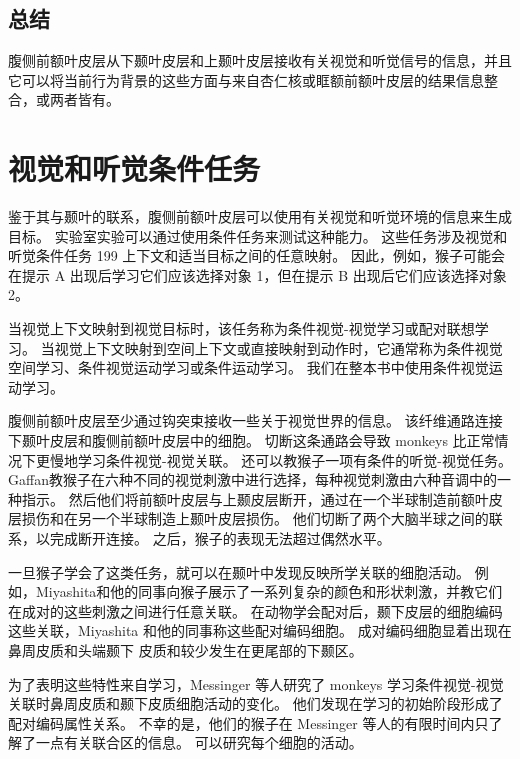 \subsection{总结}
腹侧前额叶皮层从下颞叶皮层和上颞叶皮层接收有关视觉和听觉信号的信息，并且它可以将当前行为背景的这些方面与来自杏仁核或眶额前额叶皮层的结果信息整合\cite{barbas1989architecture}，或两者皆有。


\section{视觉和听觉条件任务}
\par
鉴于其与颞叶的联系，腹侧前额叶皮层可以使用有关视觉和听觉环境的信息来生成目标。 
实验室实验可以通过使用条件任务来测试这种能力。 
这些任务涉及视觉和听觉条件任务 199 上下文和适当目标之间的任意映射。
因此，例如，猴子可能会在提示 A 出现后学习它们应该选择对象 1，但在提示 B 出现后它们应该选择对象 2。
\par


当视觉上下文映射到视觉目标时，该任务称为条件视觉-视觉学习或配对联想学习。 
当视觉上下文映射到空间上下文或直接映射到动作时，它通常称为条件视觉空间学习、条件视觉运动学习或条件运动学习。
我们在整本书中使用条件视觉运动学习。
\par


腹侧前额叶皮层至少通过钩突束接收一些关于视觉世界的信息。 
该纤维通路连接下颞叶皮层和腹侧前额叶皮层中的细胞\cite{ungerleider1989projections}。 
切断这条通路会导致 monkeys 比正常情况下更慢地学习条件视觉-视觉关联\cite{eacott1992inferotemporal,gutnikov1997temporo}。
还可以教猴子一项有条件的听觉-视觉任务。 
Gaffan\cite{gaffan1991auditory}教猴子在六种不同的视觉刺激中进行选择，每种视觉刺激由六种音调中的一种指示。 
然后他们将前额叶皮层与上颞皮层断开，通过在一个半球制造前额叶皮层损伤和在另一个半球制造上颞叶皮层损伤。 
他们切断了两个大脑半球之间的联系，以完成断开连接。 
之后，猴子的表现无法超过偶然水平。
\par


一旦猴子学会了这类任务，就可以在颞叶中发现反映所学关联的细胞活动。 
例如，Miyashita和他的同事向猴子展示了一系列复杂的颜色和形状刺激，并教它们在成对的这些刺激之间进行任意关联\cite{sakai1991neural,naya1996activity}。
在动物学会配对后，颞下皮层的细胞编码这些关联，Miyashita 和他的同事称这些配对编码细胞。 
成对编码细胞显着出现在鼻周皮质和头端颞下
皮质和较少发生在更尾部的下颞区\cite{naya2001backward}。
\par


为了表明这些特性来自学习，Messinger 等人\cite{messinger2001neuronal}研究了 monkeys 学习条件视觉-视觉关联时鼻周皮质和颞下皮质细胞活动的变化。 
他们发现在学习的初始阶段形成了配对编码属性关系。 
不幸的是，他们的猴子在 Messinger 等人的有限时间内只了解了一点有关联合区的信息。 
可以研究每个细胞的活动。
\par



